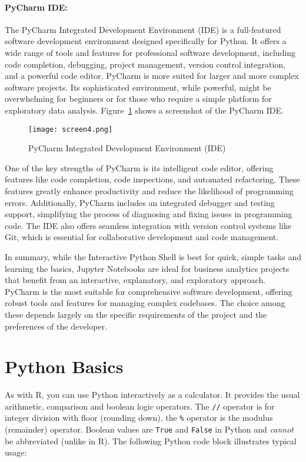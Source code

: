 \paragraph{PyCharm IDE:} The PyCharm Integrated Development Environment (IDE) is a full-featured software development environment designed specifically for Python. It offers a wide range of tools and features for professional software development, including code completion, debugging, project management, version control integration, and a powerful code editor. PyCharm is more suited for larger and more complex software projects. Its sophisticated environment, while powerful, might be overwhelming for beginners or for those who require a simple platform for exploratory data analysis. Figure~\ref{fig:pycharm} shows a screenshot of the PyCharm IDE.

\begin{figure}
\centering
\texttt{[image: screen4.png]}
\caption{PyCharm Integrated Development Environment (IDE)}
\label{fig:pycharm}
\end{figure}

One of the key strengths of PyCharm is its intelligent code editor, offering features like code completion, code inspections, and automated refactoring. These features greatly enhance productivity and reduce the likelihood of programming errors. Additionally, PyCharm includes an integrated debugger and testing support, simplifying the process of diagnosing and fixing issues in programming code. The IDE also offers seamless integration with version control systems like Git, which is essential for collaborative development and code management.

In summary, while the Interactive Python Shell is best for quick, simple tasks and learning the basics, Jupyter Notebooks are ideal for business analytics projects that benefit from an interactive, explanatory, and exploratory approach. PyCharm is the most suitable for comprehensive software development, offering robust tools and features for managing complex codebases. The choice among these depends largely on the specific requirements of the project and the preferences of the developer.


\section{Python Basics}

As with R, you can use Python interactively as a calculator. It provides the usual arithmetic, comparison and boolean logic operators. The \texttt{//} operator is for integer division with floor (rounding down), the \texttt{\%} operator is the modulus (remainder) operator. Boolean values are \texttt{True} and \texttt{False} in Python and \emph{cannot} be abbreviated (unlike in R). The following Python code block illustrates typical usage:

